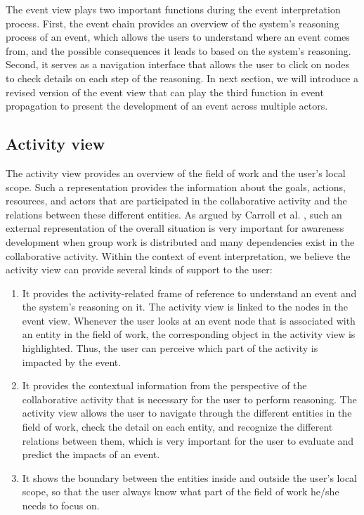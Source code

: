  The event view plays two important functions during the event interpretation process. First, the event chain provides an overview of the system's reasoning process of an event, which allows the users to understand where an event comes from, and the possible consequences it leads to based on the system's reasoning. Second, it serves as a navigation interface that allows the user to click on nodes to check details on each step of the reasoning. In next section, we will introduce a revised version of the event view that can play the third function in event propagation to present the development of an event across multiple actors.

\subsection{Activity view} %
\label{sub:activity_view}
The activity view provides an overview of the field of work and the user's local scope. Such a representation provides the information about the goals, actions, resources, and actors that are participated in the collaborative activity and the relations between these different entities. As argued by Carroll et al. \cite{carroll2003a}, such an external representation of the overall situation is very important for awareness development when group work is distributed and many dependencies exist in the collaborative activity. Within the context of event interpretation, we believe the activity view can provide several kinds of support to the user:

\begin{enumerate}
	\item It provides the activity-related frame of reference to understand an event and the system's reasoning on it. The activity view is linked to the nodes in the event view. Whenever the user looks at an event node that is associated with an entity in the field of work, the corresponding object in the activity view is highlighted. Thus, the user can perceive which part of the activity is impacted by the event.
	\item It provides the contextual information from the perspective of the collaborative activity that is necessary for the user to perform reasoning. The activity view allows the user to navigate through the different entities in the field of work, check the detail on each entity, and recognize the different relations between them, which is very important for the user to evaluate and predict the impacts of an event.
	\item It shows the boundary between the entities inside and outside the user's local scope, so that the user always know what part of the field of work he/she needs to focus on.
\end{enumerate}

